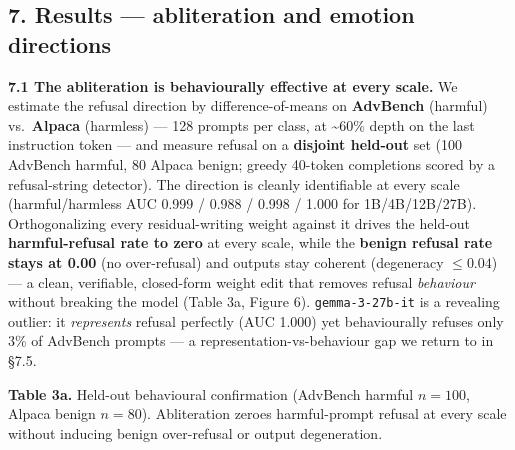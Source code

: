 \documentclass[
]{article}
\begin{document}
\subsection{7. Results --- abliteration and emotion
directions}\label{results-abliteration-and-emotion-directions}

\textbf{7.1 The abliteration is behaviourally effective at every scale.}
We estimate the refusal direction by difference-of-means on
\textbf{AdvBench} (harmful) vs.~\textbf{Alpaca} (harmless) --- 128
prompts per class, at \textasciitilde60\% depth on the last instruction
token --- and measure refusal on a \textbf{disjoint held-out} set (100
AdvBench harmful, 80 Alpaca benign; greedy 40-token completions scored
by a refusal-string detector). The direction is cleanly identifiable at
every scale (harmful/harmless AUC 0.999 / 0.988 / 0.998 / 1.000 for
1B/4B/12B/27B). Orthogonalizing every residual-writing weight against it
drives the held-out \textbf{harmful-refusal rate to zero} at every
scale, while the \textbf{benign refusal rate stays at 0.00} (no
over-refusal) and outputs stay coherent (degeneracy \(\le 0.04\)) --- a
clean, verifiable, closed-form weight edit that removes refusal
\emph{behaviour} without breaking the model (Table 3a, Figure 6).
\texttt{gemma-3-27b-it} is a revealing outlier: it \emph{represents}
refusal perfectly (AUC 1.000) yet behaviourally refuses only 3\% of
AdvBench prompts --- a representation-vs-behaviour gap we return to in
§7.5.

\textbf{Table 3a.} Held-out behavioural confirmation (AdvBench harmful
\(n{=}100\), Alpaca benign \(n{=}80\)). Abliteration zeroes
harmful-prompt refusal at every scale without inducing benign
over-refusal or output degeneration.
\end{document}
